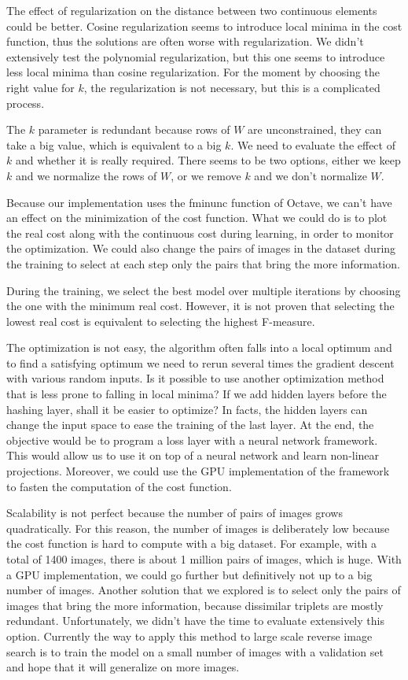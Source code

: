 The effect of regularization on the distance between two continuous elements could be better. Cosine regularization seems to introduce local minima in the cost function, thus the solutions are often worse with regularization. We didn't extensively test the polynomial regularization, but this one seems to introduce less local minima than cosine regularization. For the moment by choosing the right value for $k$, the regularization is not necessary, but this is a complicated process.

The $k$ parameter is redundant because rows of $W$ are unconstrained, they can take a big value, which is equivalent to a big $k$. We need to evaluate the effect of $k$ and whether it is really required. There seems to be two options, either we keep $k$ and we normalize the rows of $W$, or we remove $k$ and we don't normalize $W$. 

Because our implementation uses the fminunc function of Octave, we can't have an effect on the minimization of the cost function. What we could do is to plot the real cost along with the continuous cost during learning, in order to monitor the optimization. We could also change the pairs of images in the dataset during the training to select at each step only the pairs that bring the more information.

During the training, we select the best model over multiple iterations by choosing the one with the minimum real cost. However, it is not proven that selecting the lowest real cost is equivalent to selecting the highest F-measure. 

The optimization is not easy, the algorithm often falls into a local optimum and to find a satisfying optimum we need to rerun several times the gradient descent with various random inputs. Is it possible to use another optimization method that is less prone to falling in local minima? If we add hidden layers before the hashing layer, shall it be easier to optimize? In facts, the hidden layers can change the input space to ease the training of the last layer. At the end, the objective would be to program a loss layer with a neural network framework. This would allow us to use it on top of a neural network and learn non-linear projections. Moreover, we could use the GPU implementation of the framework to fasten the computation of the cost function.

Scalability is not perfect because the number of pairs of images grows quadratically. For this reason, the number of images is deliberately low because the cost function is hard to compute with a big dataset. For example, with a total of 1400 images, there is about 1 million pairs of images, which is huge. With a GPU implementation, we could go further but definitively not up to a big number of images. Another solution that we explored is to select only the pairs of images that bring the more information, because dissimilar triplets are mostly redundant. Unfortunately, we didn't have the time to evaluate extensively this option. Currently the way to apply this method to large scale reverse image search is to train the model on a small number of images with a validation set and hope that it will generalize on more images.
